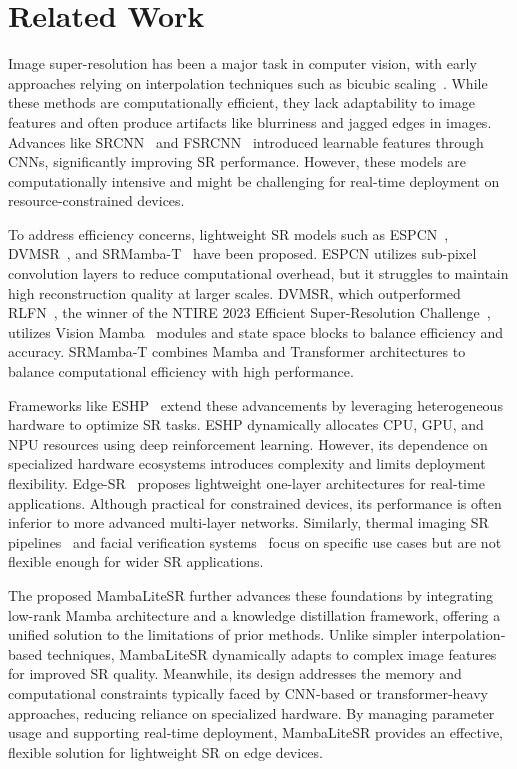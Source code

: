 \section{Related Work}
Image super-resolution has been a major task in computer vision, with early approaches relying on interpolation techniques such as bicubic scaling~\cite{jahnavi2024study, navarrete2022edge, chen2015train}. While these methods are computationally efficient, they lack adaptability to image features and often produce artifacts like blurriness and jagged edges in images. Advances like SRCNN~\cite{srcnn} and FSRCNN~\cite{fsrcnn} introduced learnable features through CNNs, significantly improving SR performance. However, these models are computationally intensive and might be challenging for real-time deployment on resource-constrained devices.

To address efficiency concerns, lightweight SR models such as ESPCN~\cite{shi2016real}, DVMSR~\cite{lei2024dvmsr}, and SRMamba-T~\cite{srmamba} have been proposed. ESPCN utilizes sub-pixel convolution layers to reduce computational overhead, but it struggles to maintain high reconstruction quality at larger scales. DVMSR, which outperformed RLFN~\cite{rlfn}, the winner of the NTIRE 2023 Efficient Super-Resolution Challenge~\cite{ntire}, utilizes Vision Mamba~\cite{zhu2024visionmamba} modules and state space blocks to balance efficiency and accuracy. SRMamba-T combines Mamba and Transformer architectures to balance computational efficiency with high performance.

Frameworks like ESHP~\cite{wang2024eshp} extend these advancements by leveraging heterogeneous hardware to optimize SR tasks. ESHP dynamically allocates CPU, GPU, and NPU resources using deep reinforcement learning. However, its dependence on specialized hardware ecosystems introduces complexity and limits deployment flexibility. Edge-SR~\cite{navarrete2022edge} proposes lightweight one-layer architectures for real-time applications. Although practical for constrained devices, its performance is often inferior to more advanced multi-layer networks. Similarly, thermal imaging SR pipelines~\cite{mathur2021real} and facial verification systems~\cite{perez2023efficient} focus on specific use cases but are not flexible enough for wider SR applications.

The proposed MambaLiteSR further advances these foundations by integrating low-rank Mamba architecture and a knowledge distillation framework, offering a unified solution to the limitations of prior methods. Unlike simpler interpolation‐based techniques, MambaLiteSR dynamically adapts to complex image features for improved SR quality. Meanwhile, its design addresses the memory and computational constraints typically faced by CNN‐based or transformer‐heavy approaches, reducing reliance on specialized hardware. By managing parameter usage and supporting real‐time deployment, MambaLiteSR provides an effective, flexible solution for lightweight SR on edge devices.

